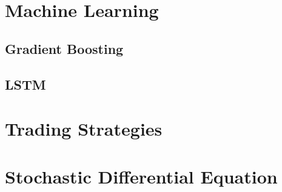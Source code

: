 \documentclass{article}
\begin{document}
\section{Machine Learning}
    \subsection{Gradient Boosting}
    \subsection{LSTM}

\section{Trading Strategies}

\section{Stochastic Differential Equation}



\end{document}
